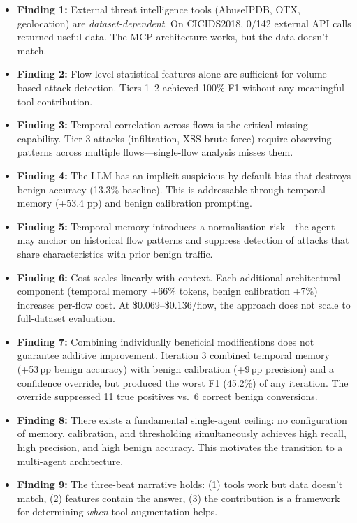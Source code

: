 \documentclass[12pt, a4paper, oneside]{report}
\begin{document}
\begin{itemize}[leftmargin=2em]
  \item \textbf{Finding 1:} External threat intelligence tools (AbuseIPDB, OTX,
        geolocation) are \emph{dataset-dependent}. On CICIDS2018, 0/142 external
        API calls returned useful data. The MCP architecture works, but the data
        doesn't match.

  \item \textbf{Finding 2:} Flow-level statistical features alone are sufficient
        for volume-based attack detection. Tiers 1--2 achieved 100\% F1 without
        any meaningful tool contribution.

  \item \textbf{Finding 3:} Temporal correlation across flows is the critical
        missing capability. Tier 3 attacks (infiltration, XSS brute force)
        require observing patterns across multiple flows---single-flow analysis
        misses them.

  \item \textbf{Finding 4:} The LLM has an implicit suspicious-by-default bias
        that destroys benign accuracy (13.3\% baseline). This is addressable
        through temporal memory (+53.4 pp) and benign calibration prompting.

  \item \textbf{Finding 5:} Temporal memory introduces a normalisation risk---the
        agent may anchor on historical flow patterns and suppress detection of
        attacks that share characteristics with prior benign traffic.

  \item \textbf{Finding 6:} Cost scales linearly with context. Each additional
        architectural component (temporal memory +66\% tokens, benign calibration
        +7\%) increases per-flow cost. At \$0.069--\$0.136/flow, the approach
        does not scale to full-dataset evaluation.

  \item \textbf{Finding 7:} Combining individually beneficial modifications
        does not guarantee additive improvement. Iteration 3 combined temporal
        memory (+53\,pp benign accuracy) with benign calibration (+9\,pp precision)
        and a confidence override, but produced the worst F1 (45.2\%) of any
        iteration. The override suppressed 11 true positives vs.\ 6 correct
        benign conversions.

  \item \textbf{Finding 8:} There exists a fundamental single-agent ceiling:
        no configuration of memory, calibration, and thresholding simultaneously
        achieves high recall, high precision, and high benign accuracy. This
        motivates the transition to a multi-agent architecture.

  \item \textbf{Finding 9:} The three-beat narrative holds: (1) tools work but
        data doesn't match, (2) features contain the answer, (3) the contribution
        is a framework for determining \emph{when} tool augmentation helps.
\end{itemize}
\end{document}
